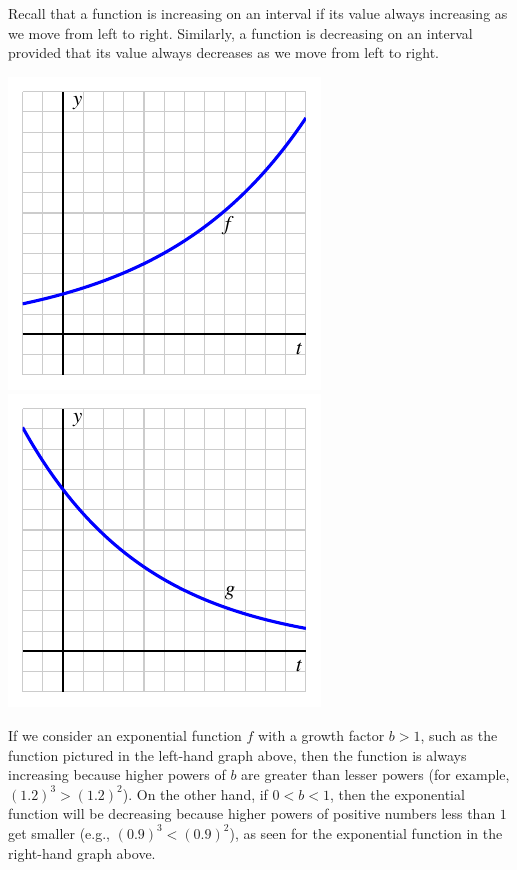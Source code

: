 \documentclass[nooutcomes]{ximera}
\begin{document}
Recall that a function is increasing on an interval if its value always increasing as we move from left to right.  Similarly, a function is decreasing on an interval provided that its value always decreases as we move from left to right.

\begin{image}
\includegraphics{growth-incr-CCU}
\includegraphics{growth-decr-CCU}
\end{image}

If we consider an exponential function \(f\) with a growth factor \(b > 1\), such as the function pictured in the left-hand graph above, then the function is always increasing because higher powers of \(b\) are greater than lesser powers (for example, \((1.2)^3 \gt (1.2)^2\)).  On the other hand, if \(0 \lt b \lt 1\), then the exponential function will be decreasing because higher powers of positive numbers less than \(1\) get smaller (e.g., \((0.9)^3 \lt (0.9)^2\)), as seen for the exponential function in the right-hand graph above.
\end{document}
